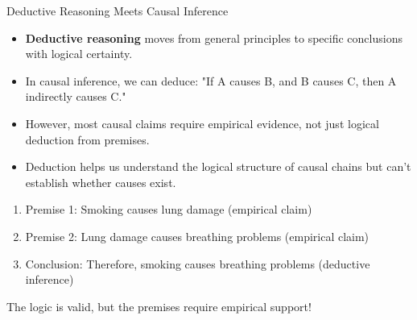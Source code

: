 \documentclass{beamer}
\begin{document}
	\begin{frame}{Deductive Reasoning Meets Causal Inference}
		\begin{itemize}
			\item \textbf{Deductive reasoning} moves from general principles to specific conclusions with logical certainty.
			\item In causal inference, we can deduce: "If A causes B, and B causes C, then A indirectly causes C."
			\item However, most causal claims require empirical evidence, not just logical deduction from premises.
			\item Deduction helps us understand the logical structure of causal chains but can't establish whether causes exist.
		\end{itemize}
		
		\begin{example}
			\begin{enumerate}
				\item Premise 1: Smoking causes lung damage (empirical claim)
				\item Premise 2: Lung damage causes breathing problems (empirical claim)
				\item Conclusion: Therefore, smoking causes breathing problems (deductive inference)
			\end{enumerate}
			The logic is valid, but the premises require empirical support!
		\end{example}
	\end{frame}
	
\end{document}
